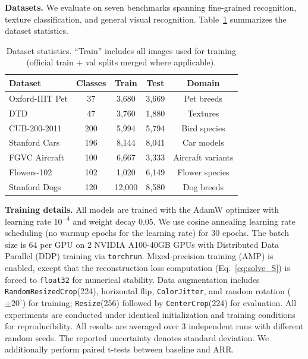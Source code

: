 \documentclass[review,12pt,authoryear]{elsarticle}
\newcommand{\method}{ARR}
\begin{document}
\textbf{Datasets.}
We evaluate on seven benchmarks spanning fine-grained recognition, texture classification, and general visual recognition.
Table~\ref{tab:datasets} summarizes the dataset statistics.

\begin{table}[t]
\centering
\caption{Dataset statistics. ``Train'' includes all images used for training (official train + val splits merged where applicable).}
\label{tab:datasets}
\small
\begin{tabular}{lcccc}
\toprule
Dataset & Classes & Train & Test & Domain \\
\midrule
Oxford-IIIT Pet \citep{parkhi2012cats}  & 37  & 3{,}680  & 3{,}669  & Pet breeds \\
DTD \citep{cimpoi2014describing}         & 47  & 3{,}760  & 1{,}880  & Textures \\
CUB-200-2011 \citep{wah2011caltech}      & 200 & 5{,}994  & 5{,}794  & Bird species \\
Stanford Cars \citep{krause2013collecting} & 196 & 8{,}144  & 8{,}041  & Car models \\
FGVC Aircraft \citep{maji2013fine}        & 100 & 6{,}667  & 3{,}333  & Aircraft variants \\
Flowers-102 \citep{nilsback2008automated} & 102 & 1{,}020  & 6{,}149  & Flower species \\
Stanford Dogs \citep{khosla2011novel}     & 120 & 12{,}000 & 8{,}580  & Dog breeds \\
\bottomrule
\end{tabular}
\end{table}

\textbf{Training details.}
All models are trained with the AdamW optimizer \citep{loshchilov2019decoupled} with learning rate $10^{-4}$ and weight decay 0.05.
We use cosine annealing learning rate scheduling (no warmup epochs for the learning rate) for 30 epochs.
The batch size is 64 per GPU on 2 NVIDIA A100-40GB GPUs with Distributed Data Parallel (DDP) training via \texttt{torchrun}.
Mixed-precision training (AMP) is enabled, except that the reconstruction loss computation (Eq.~\eqref{eq:solve_S}) is forced to \texttt{float32} for numerical stability.
Data augmentation includes \texttt{RandomResizedCrop}(224), horizontal flip, \texttt{ColorJitter}, and random rotation ($\pm 20^\circ$) for training; \texttt{Resize}(256) followed by \texttt{CenterCrop}(224) for evaluation.
All experiments are conducted under identical initialization and training conditions for reproducibility.
All results are averaged over 3 independent runs with different random seeds.
The reported uncertainty denotes standard deviation.
We additionally perform paired t-tests between baseline and \method{}.
\end{document}
